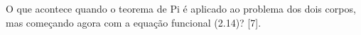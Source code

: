 O que acontece quando o teorema de Pi é aplicado ao problema dos dois corpos, mas começando agora com a equação funcional (2.14)? [7].

